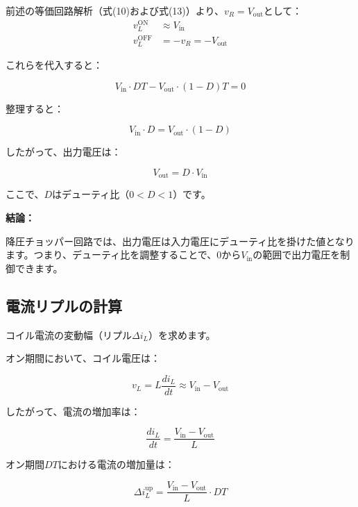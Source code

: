前述の等価回路解析（式(10)および式(13)）より、$v_R = V_{\text{out}}$として：
\begin{align}
v_L^{\text{ON}} &\approx V_{\text{in}} \\
v_L^{\text{OFF}} &= -v_R = -V_{\text{out}}
\end{align}

これらを代入すると：

\begin{equation}
V_{\text{in}} \cdot DT - V_{\text{out}} \cdot (1-D)T = 0
\end{equation}

整理すると：

\begin{equation}
V_{\text{in}} \cdot D = V_{\text{out}} \cdot (1-D)
\end{equation}

したがって、出力電圧は：

\begin{equation}
\boxed{V_{\text{out}} = D \cdot V_{\text{in}}}
\end{equation}

ここで、$D$はデューティ比（$0 < D < 1$）です。

\textbf{結論：}

降圧チョッパー回路では、出力電圧は入力電圧にデューティ比を掛けた値となります。つまり、デューティ比を調整することで、$0$から$V_{\text{in}}$の範囲で出力電圧を制御できます。

\subsection{電流リプルの計算}

コイル電流の変動幅（リプル$\Delta i_L$）を求めます。

オン期間において、コイル電圧は：

\begin{equation}
v_L = L \frac{di_L}{dt} \approx V_{\text{in}} - V_{\text{out}}
\end{equation}

したがって、電流の増加率は：

\begin{equation}
\frac{di_L}{dt} = \frac{V_{\text{in}} - V_{\text{out}}}{L}
\end{equation}

オン期間$DT$における電流の増加量は：

\begin{equation}
\Delta i_L^{\text{up}} = \frac{V_{\text{in}} - V_{\text{out}}}{L} \cdot DT
\end{equation}

